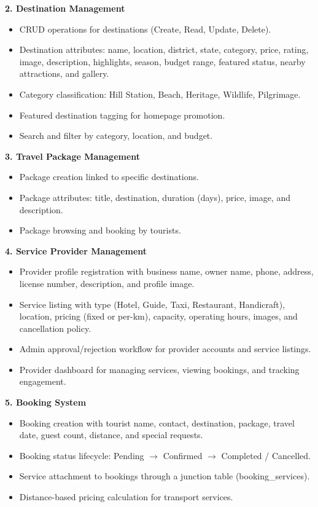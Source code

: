 \textbf{2. Destination Management}
\begin{itemize}[leftmargin=2em]
    \item CRUD operations for destinations (Create, Read, Update, Delete).
    \item Destination attributes: name, location, district, state, category, price, rating, image, description, highlights, season, budget range, featured status, nearby attractions, and gallery.
    \item Category classification: Hill Station, Beach, Heritage, Wildlife, Pilgrimage.
    \item Featured destination tagging for homepage promotion.
    \item Search and filter by category, location, and budget.
\end{itemize}

\textbf{3. Travel Package Management}
\begin{itemize}[leftmargin=2em]
    \item Package creation linked to specific destinations.
    \item Package attributes: title, destination, duration (days), price, image, and description.
    \item Package browsing and booking by tourists.
\end{itemize}

\textbf{4. Service Provider Management}
\begin{itemize}[leftmargin=2em]
    \item Provider profile registration with business name, owner name, phone, address, license number, description, and profile image.
    \item Service listing with type (Hotel, Guide, Taxi, Restaurant, Handicraft), location, pricing (fixed or per-km), capacity, operating hours, images, and cancellation policy.
    \item Admin approval/rejection workflow for provider accounts and service listings.
    \item Provider dashboard for managing services, viewing bookings, and tracking engagement.
\end{itemize}

\textbf{5. Booking System}
\begin{itemize}[leftmargin=2em]
    \item Booking creation with tourist name, contact, destination, package, travel date, guest count, distance, and special requests.
    \item Booking status lifecycle: Pending $\rightarrow$ Confirmed $\rightarrow$ Completed / Cancelled.
    \item Service attachment to bookings through a junction table (booking\_services).
    \item Distance-based pricing calculation for transport services.
\end{itemize}


